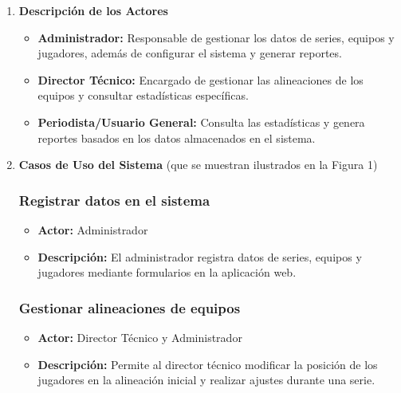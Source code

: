 \documentclass{report}
\begin{document}
        \begin{enumerate}
        \item \textbf{Descripción de los Actores}

            \begin{itemize}
                \item \textbf{Administrador:} Responsable de gestionar los datos de series, equipos y jugadores, 
                además de configurar el sistema y generar reportes.
                \item \textbf{Director Técnico:} Encargado de gestionar las alineaciones de los equipos y consultar 
                estadísticas específicas.
                \item \textbf{Periodista/Usuario General:} Consulta las estadísticas y genera reportes basados en 
                los datos almacenados en el sistema.
            \end{itemize}

        \item \textbf{Casos de Uso del Sistema} (que se muestran ilustrados en la Figura 1)
            
            \subsubsection{Registrar datos en el sistema}
            \begin{itemize}
                \item \textbf{Actor:} Administrador
                \item \textbf{Descripción:} El administrador registra datos de series, equipos y jugadores mediante 
                formularios en la aplicación web.
            \end{itemize}

            \subsubsection{Gestionar alineaciones de equipos}
            \begin{itemize}
                \item \textbf{Actor:} Director Técnico y Administrador
                \item \textbf{Descripción:} Permite al director técnico modificar la posición de los jugadores en 
                la alineación inicial y realizar ajustes durante una serie.
            \end{itemize}


\end{enumerate}
\end{document}
